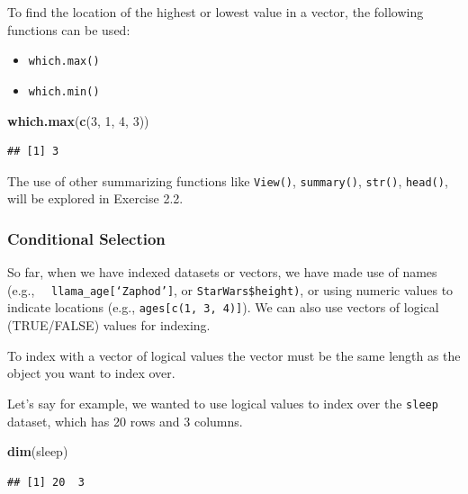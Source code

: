 \documentclass[
]{book}
\newenvironment{Shaded}{\begin{snugshade}}{\end{snugshade}}
\newcommand{\DecValTok}[1]{\textcolor[rgb]{0.00,0.00,0.81}{#1}}
\newcommand{\FunctionTok}[1]{\textcolor[rgb]{0.13,0.29,0.53}{\textbf{#1}}}
\newcommand{\NormalTok}[1]{#1}
\begin{document}
To find the location of the highest or lowest value in a vector, the following functions can be used:

\begin{itemize}
\item
  \texttt{which.max()}
\item
  \texttt{which.min()}
\end{itemize}

\begin{Shaded}
\begin{Highlighting}[]
\FunctionTok{which.max}\NormalTok{(}\FunctionTok{c}\NormalTok{(}\DecValTok{3}\NormalTok{, }\DecValTok{1}\NormalTok{, }\DecValTok{4}\NormalTok{, }\DecValTok{3}\NormalTok{))}
\end{Highlighting}
\end{Shaded}

\begin{verbatim}
## [1] 3
\end{verbatim}

The use of other summarizing functions like \texttt{View()}, \texttt{summary()}, \texttt{str()}, \texttt{head()}, will be explored in Exercise 2.2.

\subsubsection{Conditional Selection}\label{conditional-selection}

So far, when we have indexed datasets or vectors, we have made use of names (e.g.,~~ \texttt{llama\_age{[}‘Zaphod’{]}}, or \texttt{StarWars\$height)}, or using numeric values to indicate locations (e.g., \texttt{ages{[}c(1,\ 3,\ 4){]}}). We can also use vectors of logical (TRUE/FALSE) values for indexing.

To index with a vector of logical values the vector must be the same length as the object you want to index over.

Let's say for example, we wanted to use logical values to index over the \texttt{sleep} dataset, which has 20 rows and 3 columns.

\begin{Shaded}
\begin{Highlighting}[]
\FunctionTok{dim}\NormalTok{(sleep)}
\end{Highlighting}
\end{Shaded}

\begin{verbatim}
## [1] 20  3
\end{verbatim}
\end{document}

